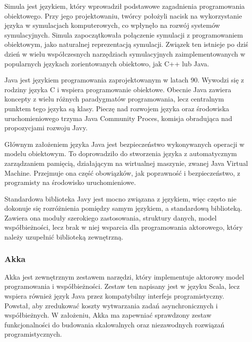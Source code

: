 Simula \autocite{dahl1968simula} jest językiem, który wprowadził podstawowe zagadnienia programowania obiektowego. Przy jego projektowaniu, twórcy położyli nacisk na wykorzystanie języka w symulacjach komputerowych, co wpłynęło na rozwój systemów symulacyjnych. Simula zapoczątkowała połączenie symulacji z programowaniem obiektowym, jako naturalnej reprezentacją symulacji. Związek ten istnieje po dziś dzień w wielu współczesnych narzędziach symulacyjnych zaimplementowanych w popularnych językach zorientowanych obiektowo, jak C++ lub Java. \autocite{urbansim} \autocite{advanced:simulation:library}

Java \autocite{gosling1995java} jest językiem programowania zaprojektowanym w latach 90. Wywodzi się z rodziny języka C i wspiera programowanie obiektowe. Obecnie Java zawiera koncepty z wielu różnych paradygmatów programowania, lecz centralnym punktem tego języka są klasy. Pieczę nad rozwojem języka oraz środowiska uruchomieniowego trzyma Java Community Proces, komisja obradująca nad propozycjami rozwoju Javy.

Głównym założeniem języka Java jest bezpieczeństwo wykonywanych operacji w modelu obiektowym. To doprowadziło do stworzenia języka z automatycznym zarządzaniem pamięcią, działającym na wirtualnej maszynie, zwanej Java Virtual Machine. Przejmuje ona część obowiązków, jak poprawność i bezpieczeństwo, z programisty na środowisko uruchomieniowe.

Standardowa biblioteka Javy jest mocno związana z językiem, więc często nie dokonuje się rozróżnienia pomiędzy samym językiem, a standardową biblioteką. Zawiera ona moduły szerokiego zastosowania, struktury danych, model współbieżności, lecz brak w niej wsparcia dla programowania aktorowego, który należy uzupełnić biblioteką zewnętrzną.

\subsubsection{Akka}\label{akka}

Akka \autocite{akka:web} \autocite{roestenburg2015akka} jest zewnętrznym zestawem narzędzi, który implementuje aktorowy model programowania i współbieżności. Zestaw ten napisany jest w języku Scala, lecz wspiera również język Java przez kompatybilny interfejs programistyczny. Powstał, aby zredukować koszty wytwarzania zadań asynchronicznych i współbieżnych. W założeniu, Akka ma zapewniać sprawdzony zestaw funkcjonalności do budowania skalowalnych oraz niezawodnych rozwiązań programistycznych.

